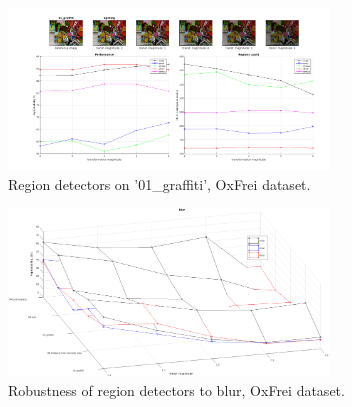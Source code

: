 \documentclass{article}
\begin{document}
\begin{figure}[htb]
\centering
\begin{minipage}[b]{.99\linewidth}
  \centering
 \centerline{\includegraphics[width=8.5cm]{./Figs/repeatability_all_combined_01_graffiti_ligthing_good}}
\end{minipage}
\hfill
\caption{Region detectors on '01\_graffiti', OxFrei dataset.}
\label{fig:det_frei}
%
\end{figure}

\begin{figure}[htb]

\begin{minipage}[b]{.9\linewidth}
  \centering
  \centerline{\includegraphics[width=8.5cm]{./Figs/blur_some_combined}}
\end{minipage}
\hfill
\caption{Robustness of region detectors to blur, OxFrei dataset.}
\label{fig:blur}
%
\end{figure}
\end{document}
